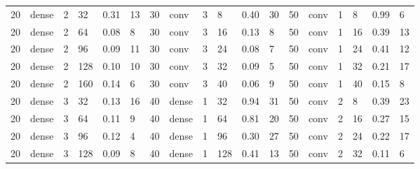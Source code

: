 \begin{table}
{\begin{tabular}{@{}llllll|llllll|llllll@{}}
20          & dense      & 2          & 32         & 0.31         & 13           & 30          & conv       & 3          & 8          & 0.40         & 30           & 50          & conv       & 1          & 8          & 0.99         & 6            \\
20          & dense      & 2          & 64         & 0.08         & 8            & 30          & conv       & 3          & 16         & 0.13         & 8            & 50          & conv       & 1          & 16         & 0.39         & 13           \\
20          & dense      & 2          & 96         & 0.09         & 11           & 30          & conv       & 3          & 24         & 0.08         & 7            & 50          & conv       & 1          & 24         & 0.41         & 12           \\
20          & dense      & 2          & 128        & 0.10         & 10           & 30          & conv       & 3          & 32         & 0.09         & 5            & 50          & conv       & 1          & 32         & 0.21         & 17           \\
20          & dense      & 2          & 160        & 0.14         & 6            & 30          & conv       & 3          & 40         & 0.06         & 9            & 50          & conv       & 1          & 40         & 0.15         & 8            \\
20          & dense      & 3          & 32         & 0.13         & 16           & 40          & dense      & 1          & 32         & 0.94         & 31           & 50          & conv       & 2          & 8          & 0.39         & 23           \\
20          & dense      & 3          & 64         & 0.11         & 9            & 40          & dense      & 1          & 64         & 0.81         & 20           & 50          & conv       & 2          & 16         & 0.27         & 15           \\
20          & dense      & 3          & 96         & 0.12         & 4            & 40          & dense      & 1          & 96         & 0.30         & 27           & 50          & conv       & 2          & 24         & 0.22         & 17           \\
20          & dense      & 3          & 128        & 0.09         & 8            & 40          & dense      & 1          & 128        & 0.41         & 13           & 50          & conv       & 2          & 32         & 0.11         & 6            \\

\end{tabular}}
\end{table}
